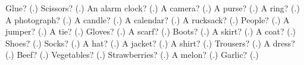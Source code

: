 \begin{tcolorbox}[breakable,colback=teal!4,colframe=teal!35!black,title={Before you move on}]
Glue? (\textbf{}.) Scissors? (\textbf{}.) An alarm clock? (\textbf{}.) A camera? (\textbf{}.) A purse? (\textbf{}.) A ring? (\textbf{}.) A photograph? (\textbf{}.) A candle? (\textbf{}.) A calendar? (\textbf{}.) A rucksack? (\textbf{}.) People? (\textbf{}.) A jumper? (\textbf{}.) A tie? (\textbf{}.) Gloves? (\textbf{}.) A scarf? (\textbf{}.) Boots? (\textbf{}.) A skirt? (\textbf{}.) A coat? (\textbf{}.) Shoes? (\textbf{}.) Socks? (\textbf{}.) A hat? (\textbf{}.) A jacket? (\textbf{}.) A shirt? (\textbf{}.) Trousers? (\textbf{}.) A dress? (\textbf{}.) Beef? (\textbf{}.) Vegetables? (\textbf{}.) Strawberries? (\textbf{}.) A melon? (\textbf{}.) Garlic? (\textbf{}.)
\end{tcolorbox}
